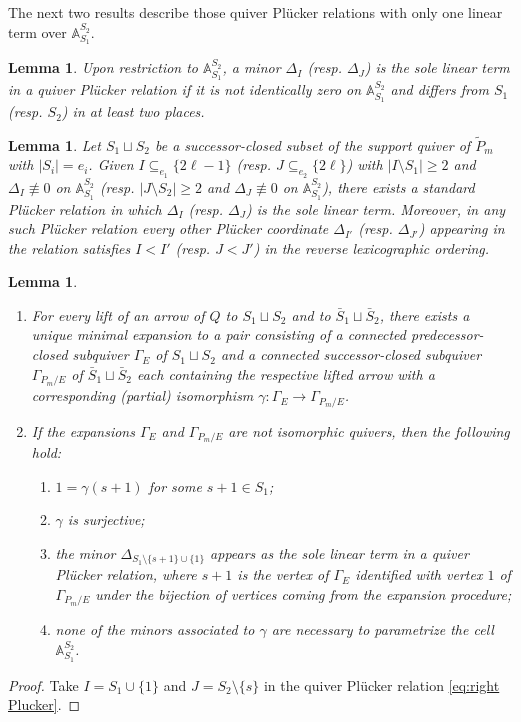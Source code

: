 \documentclass{amsart}
\newtheorem{lemma}[theorem]{Lemma}
\numberwithin{equation}{section}
\renewcommand{\AA}{\mathbb{A}}
\begin{document}
  The next two results describe those quiver Pl\"ucker relations with only one linear term over $\AA_{S_1}^{S_2}$.
  \begin{lemma}
    Upon restriction to $\AA_{S_1}^{S_2}$, a minor $\Delta_I$ (resp. $\Delta_J$) is the sole linear term in a quiver Pl\"ucker relation if it is not identically zero on $\AA_{S_1}^{S_2}$ and differs from $S_1$ (resp. $S_2$) in at least two places.
  \end{lemma}

  \begin{lemma}
    Let $S_1\sqcup S_2$ be a successor-closed subset of the support quiver of $\tilde P_m$ with $|S_i|=e_i$.
    Given $I \subseteq_{e_1} \{2\ell-1\}$ (resp. $J \subseteq_{e_2} \{2\ell\}$) with $|I\setminus S_1|\ge2$ and $\Delta_I\not\equiv 0$ on $\AA_{S_1}^{S_2}$ (resp. $|J\setminus S_2|\ge 2$ and $\Delta_J\not\equiv 0$ on $\AA_{S_1}^{S_2}$), there exists a standard Pl\"ucker relation in which $\Delta_I$ (resp. $\Delta_J$) is the sole linear term.
    Moreover, in any such Pl\"ucker relation every other Pl\"ucker coordinate $\Delta_{I'}$ (resp. $\Delta_{J'}$) appearing in the relation satisfies $I<I'$ (resp. $J<J'$) in the reverse lexicographic ordering.
  \end{lemma}
  \begin{lemma}
    \mbox{}
    \begin{enumerate}
      \item For every lift of an arrow of $Q$ to $S_1\sqcup S_2$ and to $\bar{S}_1\sqcup \bar{S}_2$, there exists a unique minimal expansion to a pair consisting of a connected predecessor-closed subquiver $\Gamma_E$ of $S_1\sqcup S_2$ and a connected successor-closed subquiver $\Gamma_{P_m/E}$ of $\bar{S}_1\sqcup \bar{S}_2$ each containing the respective lifted arrow with a corresponding (partial) isomorphism $\gamma:\Gamma_E\to\Gamma_{P_m/E}$.
      \item If the expansions $\Gamma_E$ and $\Gamma_{P_m/E}$ are not isomorphic quivers, then the following hold:
        \begin{enumerate}
          \item $1=\gamma(s+1)$ for some $s+1\in S_1$;
          \item $\gamma$ is surjective;
          \item the minor $\Delta_{S_1\setminus\{s+1\}\cup\{1\}}$ appears as the sole linear term in a quiver Pl\"ucker relation, where $s+1$ is the vertex of $\Gamma_E$ identified with vertex $1$ of $\Gamma_{P_m/E}$ under the bijection of vertices coming from the expansion procedure;
          \item none of the minors associated to $\gamma$ are necessary to parametrize the cell $\AA_{S_1}^{S_2}$.
        \end{enumerate}
    \end{enumerate}
  \end{lemma}
  \begin{proof}
    Take $I=S_1\cup\{1\}$ and $J=S_2\setminus\{s\}$ in the quiver Pl\"ucker relation \eqref{eq:right Plucker}.
  \end{proof}
\end{document}
